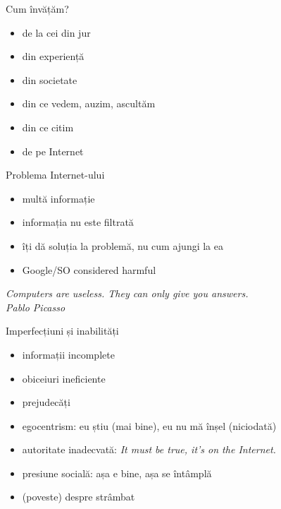 \documentclass{beamer}
\begin{document}
\begin{frame}{Cum învățăm?}
  \begin{itemize}
    \pause \item de la cei din jur
    \pause \item din experiență
    \pause \item din societate
    \pause \item din ce vedem, auzim, ascultăm
    \pause \item din ce citim
    \pause \item de pe Internet
  \end{itemize}
\end{frame}

\begin{frame}{Problema Internet-ului}
  \begin{itemize}
    \pause \item multă informație
    \item informația nu este filtrată
    \pause \item îți dă soluția la problemă, nu cum ajungi la ea
    \pause \item Google/SO considered harmful
  \end{itemize}
  \pause
  \vspace{1cm}
  \centering
  \textit{Computers are useless. They can only give you answers.}\\
  \vspace{3mm}
  \hfill \textit{Pablo Picasso}
\end{frame}

\begin{frame}{Imperfecțiuni și inabilități}
  \begin{itemize}
    \pause \item informații incomplete
    \pause \item obiceiuri ineficiente
    \pause \item prejudecăți
    \pause \item egocentrism: eu știu (mai bine), eu nu mă înșel (niciodată)
    \pause \item autoritate inadecvată: \textit{It must be true, it's on the Internet.}
    \pause \item presiune socială: așa e bine, așa se întâmplă
    \pause \item (poveste) despre strâmbat
  \end{itemize}
\end{frame}
\end{document}
